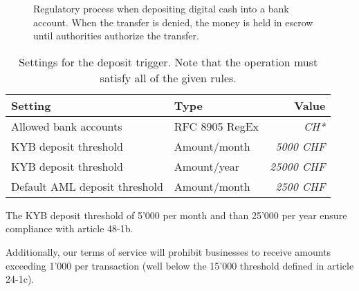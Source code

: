 \begin{figure}[h!]
\begin{center}
  \end{center}
  \caption{Regulatory process when depositing digital cash into a bank
    account.  When the transfer is denied, the money is held in escrow
    until authorities authorize the transfer.}
\end{figure}


\begin{table}[h!]
  \caption{Settings for the deposit trigger. Note that the operation
  must satisfy all of the given rules.}
  \begin{tabular}{l|l|r}
    {\bf Setting}                 & {\bf Type}         & {\bf Value}    \\ \hline \hline
    Allowed bank accounts         & RFC 8905 RegEx     & {\em CH*}      \\ \hline
    KYB deposit threshold         & Amount/month       & {\em  5000 CHF} \\
    KYB deposit threshold         & Amount/year        & {\em 25000 CHF} \\
    Default AML deposit threshold & Amount/month       & {\em  2500 CHF} \\
  \end{tabular}
\end{table}

The KYB deposit threshold of 5'000 \CURRENCY{} per month and than 25'000
\CURRENCY{} per year ensure compliance with article 48-1b.

Additionally, our terms of service will prohibit businesses to receive
amounts exceeding 1'000 \CURRENCY{} per transaction (well below the
15'000 \CURRENCY{} threshold defined in article 24-1c).

